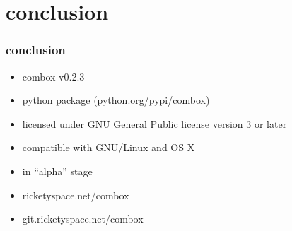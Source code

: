 
\section{conclusion}

\begin{frame}
  \frametitle{conclusion}

  \begin{itemize}
  \item<2-> combox v0.2.3
  \item<3-> python package (python.org/pypi/combox)
  \item<4-> licensed under GNU General Public license version 3 or
    later
  \item<5-> compatible with GNU/Linux and OS X
  \item<6-> in ``alpha'' stage
  \item<7-> ricketyspace.net/combox
  \item<8-> git.ricketyspace.net/combox
  \end{itemize}
\end{frame}
